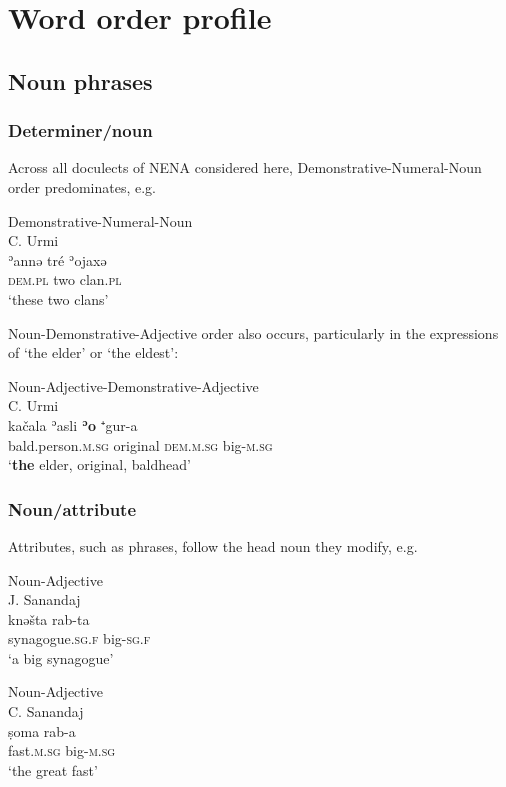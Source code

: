 \documentclass[output=paper,colorlinks,citecolor=brown,draftmode]{langscibook}
\begin{document}
\section{Word order profile}
\subsection{Noun phrases}
\subsubsection{Determiner/noun}
Across all doculects of NENA considered here, Demonstrative-Numeral-Noun order predominates, e.g.

\ea\label{NAINEI:ex:1}
Demonstrative-Numeral-Noun\\
C. Urmi \citep[A55:§7]{Khan2016CUrmi} \\
\gll ʾannə tré ʾojaxə \\
     \textsc{dem.pl} two clan\textsc{.pl} \\
\glt `these two clans'
\z

Noun-Demonstrative-Adjective order also occurs, particularly in the expressions of `the elder' or `the eldest': 

\ea\label{NAINEI:ex:2}
Noun-Adjective-Demonstrative-Adjective\\
C. Urmi \citep[A1:§29]{Khan2016CUrmi}\\
\gll kačala ʾasli \textbf{ʾo} ⁺gur-a \\
     bald.person\textsc{.m.sg} original \textsc{dem.m.sg} big\textsc{-m.sg} \\
\glt `\textbf{the} elder, original, baldhead' 
\z

\subsubsection{Noun/attribute}
Attributes, such as  phrases,  follow the head noun they modify, e.g.

\ea\label{NAINEI:ex:3}
Noun-Adjective\\
J. Sanandaj \citep[B:§58]{Khan2009JSana} \\
\gll knəšta rab-ta \\
     synagogue\textsc{.sg.f} big\textsc{-sg.f} \\
\glt `a big synagogue'
\z

\ea\label{NAINEI:ex:4}
Noun-Adjective\\
C. Sanandaj \citep[125.§6]{Panoussi1990Senaya}\\
\gll ṣoma rab-a \\
     fast\textsc{.m.sg} big\textsc{-m.sg} \\
\glt `the great fast'
\z
\end{document}
